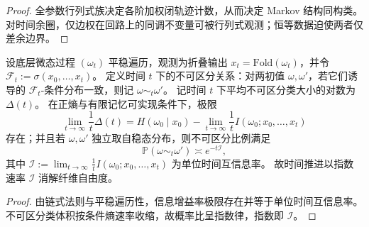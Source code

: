 \begin{proof}
全参数行列式族决定各阶加权闭轨迹计数，从而决定 Markov 结构同构类。
对时间余圈，仅边权在回路上的同调不变量可被行列式观测；恒等数据迫使两者仅差余边界。
\end{proof}

\begin{theorem}\label{thm:xi-finite-time-distinguishability-mutual-information-rate}
设底层微态过程 \((\omega_t)\) 平稳遍历，观测为折叠输出 \(x_t=\mathrm{Fold}(\omega_t)\)，并令 \(\mathcal F_t:=\sigma(x_0,\dots,x_t)\)。
定义时间 \(t\) 下的不可区分关系：对两初值 \(\omega,\omega'\)，若它们诱导的 \(\mathcal F_t\)-条件分布一致，则记 \(\omega\sim_t\omega'\)。
记时间 \(t\) 下平均不可区分类大小的对数为 \(\Delta(t)\)。
在正熵与有限记忆可实现条件下，极限
\[
\lim_{t\to\infty}\frac1t\Delta(t)
=
H(\omega_0\mid x_0)-\lim_{t\to\infty}\frac1t I(\omega_0;x_0,\dots,x_t)
\]
存在；并且若 \(\omega,\omega'\) 独立取自稳态分布，则不可区分比例满足
\[
\mathbb P(\omega\sim_t\omega')\asymp e^{-t\mathcal I},
\]
其中 \(\mathcal I:=\lim_{t\to\infty}\frac1t I(\omega_0;x_0,\dots,x_t)\) 为单位时间互信息率。
故时间推进以指数速率 \(\mathcal I\) 消解纤维自由度。
\end{theorem}

\begin{proof}
由链式法则与平稳遍历性，信息增益率极限存在并等于单位时间互信息率。
不可区分类体积按条件熵速率收缩，故概率比呈指数律，指数即 \(\mathcal I\)。
\end{proof}


